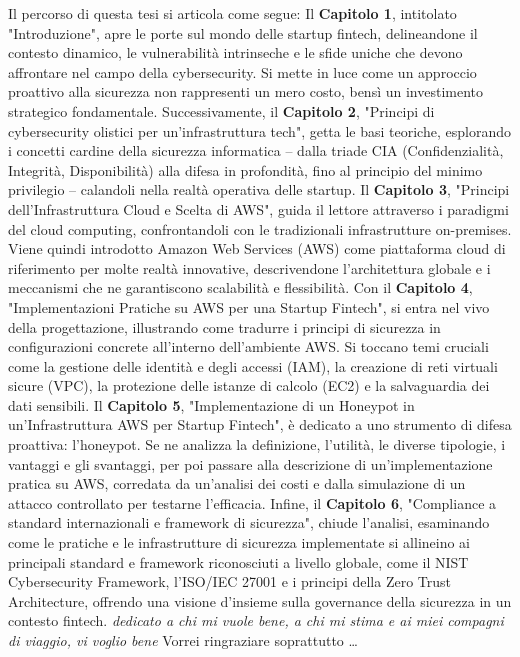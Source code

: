 \documentclass[a4paper,12pt]{report}
\begin{document}
        Il percorso di questa tesi si articola come segue:
        Il \textbf{Capitolo 1}, intitolato "Introduzione", apre le porte sul mondo delle startup fintech, delineandone il contesto dinamico, le vulnerabilità intrinseche e le sfide uniche che devono affrontare nel campo della cybersecurity. Si mette in luce come un approccio proattivo alla sicurezza non rappresenti un mero costo, bensì un investimento strategico fondamentale.
        Successivamente, il \textbf{Capitolo 2}, "Principi di cybersecurity olistici per un'infrastruttura tech", getta le basi teoriche, esplorando i concetti cardine della sicurezza informatica – dalla triade CIA (Confidenzialità, Integrità, Disponibilità) alla difesa in profondità, fino al principio del minimo privilegio – calandoli nella realtà operativa delle startup.
        Il \textbf{Capitolo 3}, "Principi dell'Infrastruttura Cloud e Scelta di AWS", guida il lettore attraverso i paradigmi del cloud computing, confrontandoli con le tradizionali infrastrutture on-premises. Viene quindi introdotto Amazon Web Services (AWS) come piattaforma cloud di riferimento per molte realtà innovative, descrivendone l'architettura globale e i meccanismi che ne garantiscono scalabilità e flessibilità.
        Con il \textbf{Capitolo 4}, "Implementazioni Pratiche su AWS per una Startup Fintech", si entra nel vivo della progettazione, illustrando come tradurre i principi di sicurezza in configurazioni concrete all'interno dell'ambiente AWS. Si toccano temi cruciali come la gestione delle identità e degli accessi (IAM), la creazione di reti virtuali sicure (VPC), la protezione delle istanze di calcolo (EC2) e la salvaguardia dei dati sensibili.
        Il \textbf{Capitolo 5}, "Implementazione di un Honeypot in un'Infrastruttura AWS per Startup Fintech", è dedicato a uno strumento di difesa proattiva: l'honeypot. Se ne analizza la definizione, l'utilità, le diverse tipologie, i vantaggi e gli svantaggi, per poi passare alla descrizione di un'implementazione pratica su AWS, corredata da un'analisi dei costi e dalla simulazione di un attacco controllato per testarne l'efficacia.
        Infine, il \textbf{Capitolo 6}, "Compliance a standard internazionali e framework di sicurezza", chiude l'analisi, esaminando come le pratiche e le infrastrutture di sicurezza implementate si allineino ai principali standard e framework riconosciuti a livello globale, come il NIST Cybersecurity Framework, l'ISO/IEC 27001 e i principi della Zero Trust Architecture, offrendo una visione d'insieme sulla governance della sicurezza in un contesto fintech.
{\hfill \Large {\sl dedicato a chi mi vuole bene, a chi mi stima e ai miei compagni di viaggio, vi voglio bene}}
        Vorrei ringraziare soprattutto \dots
\end{document}
